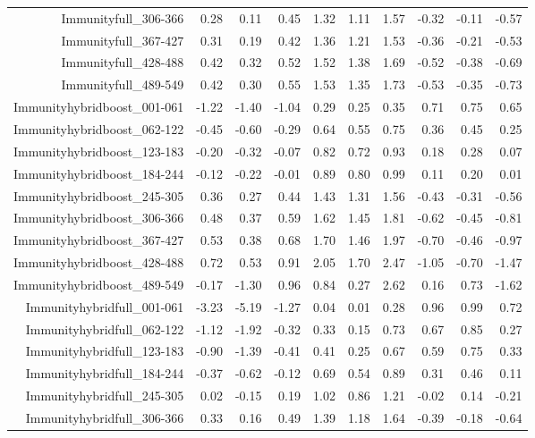 \begin{table}[ht]
\begin{tabular}{rrrrrrrrrr}
  Immunityfull\_306-366 & 0.28 & 0.11 & 0.45 & 1.32 & 1.11 & 1.57 & -0.32 & -0.11 & -0.57 \\ 
  Immunityfull\_367-427 & 0.31 & 0.19 & 0.42 & 1.36 & 1.21 & 1.53 & -0.36 & -0.21 & -0.53 \\ 
  Immunityfull\_428-488 & 0.42 & 0.32 & 0.52 & 1.52 & 1.38 & 1.69 & -0.52 & -0.38 & -0.69 \\ 
  Immunityfull\_489-549 & 0.42 & 0.30 & 0.55 & 1.53 & 1.35 & 1.73 & -0.53 & -0.35 & -0.73 \\ 
  Immunityhybridboost\_001-061 & -1.22 & -1.40 & -1.04 & 0.29 & 0.25 & 0.35 & 0.71 & 0.75 & 0.65 \\ 
  Immunityhybridboost\_062-122 & -0.45 & -0.60 & -0.29 & 0.64 & 0.55 & 0.75 & 0.36 & 0.45 & 0.25 \\ 
  Immunityhybridboost\_123-183 & -0.20 & -0.32 & -0.07 & 0.82 & 0.72 & 0.93 & 0.18 & 0.28 & 0.07 \\ 
  Immunityhybridboost\_184-244 & -0.12 & -0.22 & -0.01 & 0.89 & 0.80 & 0.99 & 0.11 & 0.20 & 0.01 \\ 
  Immunityhybridboost\_245-305 & 0.36 & 0.27 & 0.44 & 1.43 & 1.31 & 1.56 & -0.43 & -0.31 & -0.56 \\ 
  Immunityhybridboost\_306-366 & 0.48 & 0.37 & 0.59 & 1.62 & 1.45 & 1.81 & -0.62 & -0.45 & -0.81 \\ 
  Immunityhybridboost\_367-427 & 0.53 & 0.38 & 0.68 & 1.70 & 1.46 & 1.97 & -0.70 & -0.46 & -0.97 \\ 
  Immunityhybridboost\_428-488 & 0.72 & 0.53 & 0.91 & 2.05 & 1.70 & 2.47 & -1.05 & -0.70 & -1.47 \\ 
  Immunityhybridboost\_489-549 & -0.17 & -1.30 & 0.96 & 0.84 & 0.27 & 2.62 & 0.16 & 0.73 & -1.62 \\ 
  Immunityhybridfull\_001-061 & -3.23 & -5.19 & -1.27 & 0.04 & 0.01 & 0.28 & 0.96 & 0.99 & 0.72 \\ 
  Immunityhybridfull\_062-122 & -1.12 & -1.92 & -0.32 & 0.33 & 0.15 & 0.73 & 0.67 & 0.85 & 0.27 \\ 
  Immunityhybridfull\_123-183 & -0.90 & -1.39 & -0.41 & 0.41 & 0.25 & 0.67 & 0.59 & 0.75 & 0.33 \\ 
  Immunityhybridfull\_184-244 & -0.37 & -0.62 & -0.12 & 0.69 & 0.54 & 0.89 & 0.31 & 0.46 & 0.11 \\ 
  Immunityhybridfull\_245-305 & 0.02 & -0.15 & 0.19 & 1.02 & 0.86 & 1.21 & -0.02 & 0.14 & -0.21 \\ 
  Immunityhybridfull\_306-366 & 0.33 & 0.16 & 0.49 & 1.39 & 1.18 & 1.64 & -0.39 & -0.18 & -0.64 \\ 

\end{tabular}
\end{table}
